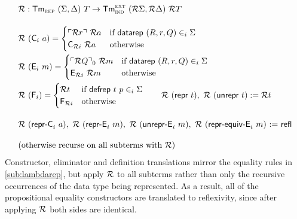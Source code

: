 \begin{align*}
  & \R : \Tm_\rep\ (\Sigma, \Delta)\ T \to \Tm_\ind^\lang{ext}\ (\R \Sigma, \R \Delta)\ \R T \\[1em]
  &\R\ (\mta{C}_i\ a) = \begin{cases}
      \emb{\R r}\ \R a & \text{if}\ \mta{datarep}\ (R, r, Q) \in_i \Sigma \\
      \mta{C}_{\R i}\ \R a & \text{otherwise}
  \end{cases} \\
  &\R\ (\mta{E}_i\ m) = \begin{cases}
      \emb{\R Q}_0\ \R m & \text{if}\ \mta{datarep}\ (R, r, Q) \in_i \Sigma \\
      \mta{E}_{\R i}\ \R m & \text{otherwise}
  \end{cases} \\
  &\R\ (\mta{F}_i) = \begin{cases}
        \R t & \text{if}\ \mta{defrep}\ t\ p \in_i \Sigma \\
        \mta{F}_{\R i} & \text{otherwise}
    \end{cases}  \qquad \R\ (\Mrepr\ t) ,\ \R\ (\Munrepr\ t) := \R t \\[1em]
  & \R\ (\mta{repr-C}_i\ a),\ \R\ (\mta{repr-E}_i\ m),\ \R\ (\mta{unrepr-E}_i\ m),\ \R\ (\mta{repr-equiv-E}_i\ m) \text{ := } \mta{refl} \\[1em]
  & \text{(otherwise recurse on all subterms with $\R$)}
\end{align*}
Constructor, eliminator and definition translations mirror the equality rules in
\cref{sub:lambdarep}, but apply $\mathcal{R}$ to all subterms rather than only the
recursive occurrences of the data type being represented. As a result, all of
the propositional equality constructors are translated to reflexivity, since
after applying $\mathcal{R}$ both sides are identical.

